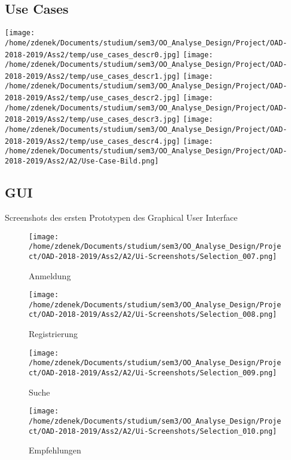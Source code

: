 \documentclass[a4paper]{article}
\begin{document}
\subsection{Use Cases}



\texttt{[image: /home/zdenek/Documents/studium/sem3/OO\_Analyse\_Design/Project/OAD-2018-2019/Ass2/temp/use\_cases\_descr0.jpg]}
\newpage
\texttt{[image: /home/zdenek/Documents/studium/sem3/OO\_Analyse\_Design/Project/OAD-2018-2019/Ass2/temp/use\_cases\_descr1.jpg]}
\newpage
\texttt{[image: /home/zdenek/Documents/studium/sem3/OO\_Analyse\_Design/Project/OAD-2018-2019/Ass2/temp/use\_cases\_descr2.jpg]}
\newpage
\texttt{[image: /home/zdenek/Documents/studium/sem3/OO\_Analyse\_Design/Project/OAD-2018-2019/Ass2/temp/use\_cases\_descr3.jpg]}
\newpage
\texttt{[image: /home/zdenek/Documents/studium/sem3/OO\_Analyse\_Design/Project/OAD-2018-2019/Ass2/temp/use\_cases\_descr4.jpg]}
\newpage
\texttt{[image: /home/zdenek/Documents/studium/sem3/OO\_Analyse\_Design/Project/OAD-2018-2019/Ass2/A2/Use-Case-Bild.png]}

\newpage

\subsection{GUI}

Screenshots des ersten Prototypen des Graphical User Interface

\begin{figure}[h]
\centering
\caption{Anmeldung}
\texttt{[image: /home/zdenek/Documents/studium/sem3/OO\_Analyse\_Design/Project/OAD-2018-2019/Ass2/A2/Ui-Screenshots/Selection\_007.png]}
\end{figure}

\begin{figure}[h]
\centering
\caption{Registrierung}
\texttt{[image: /home/zdenek/Documents/studium/sem3/OO\_Analyse\_Design/Project/OAD-2018-2019/Ass2/A2/Ui-Screenshots/Selection\_008.png]}
\end{figure}

\begin{figure}[h]
\centering
\caption{Suche}
\texttt{[image: /home/zdenek/Documents/studium/sem3/OO\_Analyse\_Design/Project/OAD-2018-2019/Ass2/A2/Ui-Screenshots/Selection\_009.png]}
\end{figure}

\begin{figure}[h]
\centering
\caption{Empfehlungen}
\texttt{[image: /home/zdenek/Documents/studium/sem3/OO\_Analyse\_Design/Project/OAD-2018-2019/Ass2/A2/Ui-Screenshots/Selection\_010.png]}
\end{figure}
\end{document}
